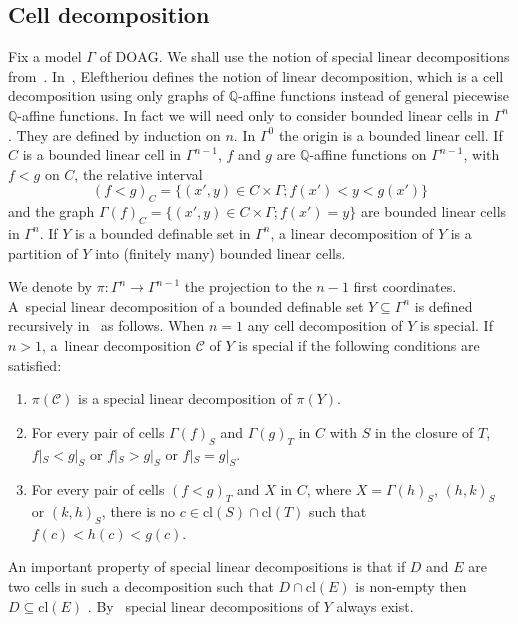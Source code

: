 \documentclass[JEP,XML,SOM,Unicode,ThmDefs,NoEqCountersInSection,published]{cedram}
\newcommand{\cl}{\mathrm{cl}}
\newcommand{\DOAG}{\mathrm{DOAG}}
\newcommand{\Q}{\mathbb Q}
\theoremstyle{plain}
\theoremstyle{definition}
\begin{document}
\subsection{Cell decomposition}
Fix a model $\Gamma$ of
$\DOAG$.
We shall use the notion
of special linear decompositions from~\cite{elef}. In~\cite{elef}, Eleftheriou defines the notion of linear decomposition, which is a cell decomposition using only
graphs of $\Q$-affine functions instead of general piecewise $\Q$-affine functions. In fact we will need only to consider bounded linear cells in $\Gamma^n$. They are defined by induction on $n$.
In $\Gamma^0$ the origin is a bounded linear cell. If $C$ is a bounded linear cell in $\Gamma^{n-1}$, $f$ and $g$ are $\Q$\nobreakdash-affine functions on $\Gamma^{n-1}$, with $f < g$ on $C$, the relative interval
\[
(f < g)_C = \{(x', y) \in C \times \Gamma; f (x') < y < g(x')\}
\]
and the graph $\Gamma (f)_C = \{(x', y) \in C \times \Gamma; f (x') = y\}$ are bounded linear cells in $\Gamma^n$.
If $Y$ is a bounded definable set in $\Gamma^n$, a linear decomposition of $Y$ is a partition of $Y$ into (finitely many) bounded linear cells.

We denote by $\pi: \Gamma^n \to \Gamma^{n-1}$ the projection to the $n-1$ first coordinates.
A~special linear decomposition of a bounded definable set $Y \subseteq \Gamma^n$ is defined recursively in~\cite{elef} as follows. When $n = 1$ any cell decomposition of $Y$ is special.
If $n > 1$, a~linear decomposition $\mathcal{C}$ of $Y$ is special if the following conditions are satisfied:\enlargethispage{\baselineskip}%
\begin{enumerate}
\item $\pi (\mathcal{C})$ is a special linear decomposition of $\pi (Y)$.
\item For every pair of cells $\Gamma (f)_S$ and $\Gamma (g)_T$ in $C$ with $S$ in the closure of $T$,
$f|_S <g|_S$ or $f|_S >g|_S$ or $f|_S =g|_S$.
\item\label{item3} For every pair of cells $(f<g)_T$ and $X$ in $C$, where $X = \Gamma (h)_S$, $(h,k)_S$ or $(k,h)_S$,
there is no $c \in \cl(S) \cap \cl(T)$ such that $f(c) < h(c) < g(c)$.
\end{enumerate}

An important property of special linear decompositions is that if $D$ and $E$ are two cells in such a decomposition such that
$D \cap \cl (E)$ is non-empty then $D \subseteq \cl (E)$ \cite[Fact 2.3]{elef}.
By~\cite[Fact 2.2]{elef} special linear decompositions of $Y$ always exist.
\end{document}
